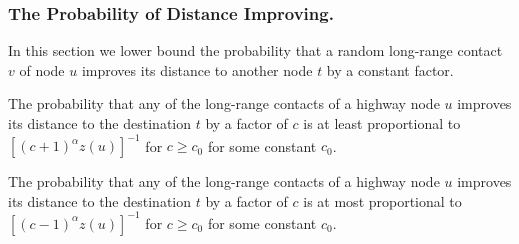 \vspace*{-\medskipamount}
\vspace*{-\medskipamount}

\subsubsection{The Probability of Distance Improving.} \label{sec:prob-halving}
%
In this section we lower bound the probability that a random long-range
contact $v$ of node $u$ improves its distance to another node $t$ by a constant
factor.
%
\begin{lemma} \label{lem:prob-halving}
	The probability that any of the long-range contacts of a highway node $u$
	improves its distance to the destination $t$ by a factor of $c$ is at least
	proportional to $[(c + 1)^\alpha z(u)]^{-1}$ for $c \geq c_0$ for some
	constant $c_0$.
\end{lemma}
%
\begin{corollary} \label{cor:prob-halving-upper}
	The probability that any of the long-range contacts of a highway node $u$
	improves its distance to the destination $t$ by a factor of $c$ is at most
	proportional to $[(c - 1)^\alpha z(u)]^{-1}$ for $c \geq c_0$ for some
	constant $c_0$.
\end{corollary}
%
